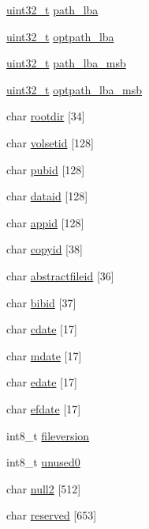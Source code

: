 \begin{DoxyCompactItemize}
\item 
\hyperlink{aplus_8h_a53a0df51603c77c2aa5b9ea61b606a82}{uint32\+\_\+t} \hyperlink{structiso9660__pvd_aa5086117521602bf3f9b15770799fafd}{path\+\_\+lba}
\item 
\hyperlink{aplus_8h_a53a0df51603c77c2aa5b9ea61b606a82}{uint32\+\_\+t} \hyperlink{structiso9660__pvd_a3cc29bf3f73bf3fbd6b3ed28f5698b15}{optpath\+\_\+lba}
\item 
\hyperlink{aplus_8h_a53a0df51603c77c2aa5b9ea61b606a82}{uint32\+\_\+t} \hyperlink{structiso9660__pvd_a765368e6bf4854e3c3407b5705fcea3f}{path\+\_\+lba\+\_\+msb}
\item 
\hyperlink{aplus_8h_a53a0df51603c77c2aa5b9ea61b606a82}{uint32\+\_\+t} \hyperlink{structiso9660__pvd_a55faa8733a116936c6360e7ae6f3b20a}{optpath\+\_\+lba\+\_\+msb}
\item 
char \hyperlink{structiso9660__pvd_a4c7b731634349ebdefb9de29b1022af7}{rootdir} \mbox{[}34\mbox{]}
\item 
char \hyperlink{structiso9660__pvd_a9d462ff056bae911d25439cda11ad24e}{volsetid} \mbox{[}128\mbox{]}
\item 
char \hyperlink{structiso9660__pvd_a2deec8116091f80a2e2c93035db3225f}{pubid} \mbox{[}128\mbox{]}
\item 
char \hyperlink{structiso9660__pvd_a0a29d27dbc0e5697c5d792402b0b997a}{dataid} \mbox{[}128\mbox{]}
\item 
char \hyperlink{structiso9660__pvd_a2d316bdfc5fb447d4cc8fb0d8d13222d}{appid} \mbox{[}128\mbox{]}
\item 
char \hyperlink{structiso9660__pvd_ac823631d979880abef81ce27b040eb52}{copyid} \mbox{[}38\mbox{]}
\item 
char \hyperlink{structiso9660__pvd_aa01a9944612a700271121507c9a46977}{abstractfileid} \mbox{[}36\mbox{]}
\item 
char \hyperlink{structiso9660__pvd_a7f7dc75a65ede924ad50c9f687a38e72}{bibid} \mbox{[}37\mbox{]}
\item 
char \hyperlink{structiso9660__pvd_a24c222ddd2ef04dda8576715e1f9af69}{cdate} \mbox{[}17\mbox{]}
\item 
char \hyperlink{structiso9660__pvd_ac87f857ee6e7bc3d6b2910ef2b66ff9d}{mdate} \mbox{[}17\mbox{]}
\item 
char \hyperlink{structiso9660__pvd_ae6918d87e2f0b5c3ee804109f3231345}{edate} \mbox{[}17\mbox{]}
\item 
char \hyperlink{structiso9660__pvd_a28b756e60f3c81ddff6f6a218541e4b3}{efdate} \mbox{[}17\mbox{]}
\item 
int8\+\_\+t \hyperlink{structiso9660__pvd_ac0af4a656dd263c7b4bac1666b759ffc}{fileversion}
\item 
int8\+\_\+t \hyperlink{structiso9660__pvd_a4084400e5a30ae71df0165f3a0e5e566}{unused0}
\item 
char \hyperlink{structiso9660__pvd_a3fe9fe9cbdc559e8ccc9029f33e24899}{null2} \mbox{[}512\mbox{]}
\item 
char \hyperlink{structiso9660__pvd_a9bb088c4b2405eea90e203d31478a03a}{reserved} \mbox{[}653\mbox{]}
\end{DoxyCompactItemize}


